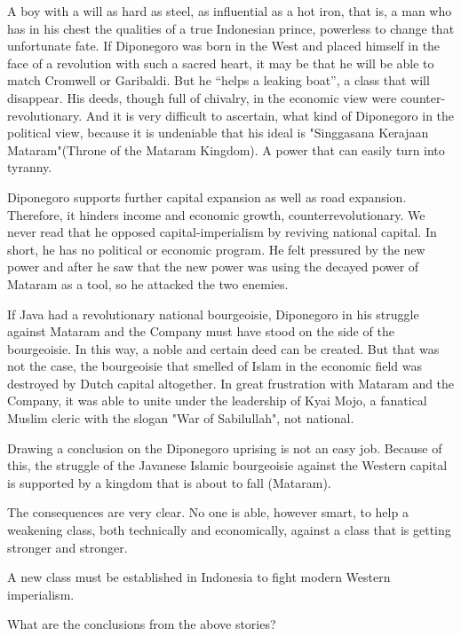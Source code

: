 A boy with a will as hard as steel, as influential as a hot iron, that is, a man who has 
in his chest the qualities of a true Indonesian prince, powerless to change that 
unfortunate fate. If Diponegoro was born in the West and placed himself in the face of 
a revolution with such a sacred heart, it may be that he will be able to match Cromwell 
or Garibaldi. But he “helps a leaking boat”, a class that will disappear. His deeds, 
though full of chivalry, in the economic view were counter-revolutionary. And it is 
very difficult to ascertain, what kind of Diponegoro in the political view, because it 
is undeniable that his ideal is "Singgasana Kerajaan Mataram"(Throne of the Mataram Kingdom). 
A power that can easily turn into tyranny.\vskip 0.2in

Diponegoro supports further capital expansion as well as road expansion. Therefore, 
it hinders income and economic growth, counterrevolutionary. We never read that he 
opposed capital-imperialism by reviving national capital. In short, he has no political 
or economic program. He felt pressured by the new power and after he saw that the new power 
was using the decayed power of Mataram as a tool, so he attacked the two enemies.\vskip 0.2in

If Java had a revolutionary national bourgeoisie, Diponegoro in his struggle against 
Mataram and the Company must have stood on the side of the bourgeoisie. In this way, 
a noble and certain deed can be created. But that was not the case, the bourgeoisie 
that smelled of Islam in the economic field was destroyed by Dutch capital altogether. 
In great frustration with Mataram and the Company, it was able to unite under the 
leadership of Kyai Mojo, a fanatical Muslim cleric with the slogan "War of Sabilullah", not national.\vskip 0.2in

Drawing a conclusion on the Diponegoro uprising is not an easy job. Because of this, 
the struggle of the Javanese Islamic bourgeoisie against the Western capital is supported 
by a kingdom that is about to fall (Mataram).\vskip 0.2in

The consequences are very clear. No one is able, however smart, to help 
a weakening class, both technically and economically, against a class that is getting stronger and stronger.\vskip 0.2in

A new class must be established in Indonesia to fight modern Western imperialism.\vskip 0.2in

What are the conclusions from the above stories?\vskip 0.2in


